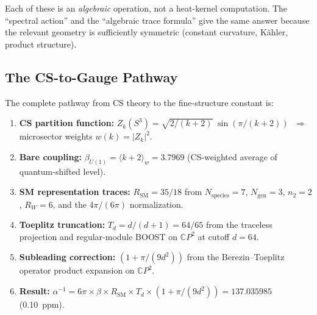 \documentclass[12pt,a4paper]{article}
\theoremstyle{definition}
\theoremstyle{remark}
\begin{document}
Each of these is an \emph{algebraic} operation, not a heat-kernel computation.
The ``spectral action'' and the ``algebraic trace formula'' give the same
answer because the relevant geometry is sufficiently symmetric
(constant curvature, K\"ahler, product structure).

\subsection{The CS-to-Gauge Pathway}

The complete pathway from CS theory to the fine-structure constant is:

\begin{tcolorbox}[colback=blue!5!white, colframe=blue!75!black,
  title={CS $\to$ Gauge Coupling Pathway (No Heat Kernel)}]
\begin{enumerate}
\item \textbf{CS partition function:}
  $Z_k(S^3) = \sqrt{2/(k+2)}\;\sin(\pi/(k+2))$
  $\;\Longrightarrow\;$ microsector weights $w(k) = |Z_k|^2$.

\item \textbf{Bare coupling:}
  $\beta_{U(1)} = \langle k+2 \rangle_w = 3.7969$
  (CS-weighted average of quantum-shifted level).

\item \textbf{SM representation traces:}
  $R_{\mathrm{SM}} = 35/18$ from $N_{\mathrm{species}} = 7$,
  $N_{\mathrm{gen}} = 3$, $n_2 = 2$, $R_W = 6$,
  and the $4\pi/(6\pi)$ normalization.

\item \textbf{Toeplitz truncation:}
  $T_d = d/(d+1) = 64/65$ from the traceless projection and
  regular-module BOOST on $\mathbb{C}P^2$ at cutoff $d = 64$.

\item \textbf{Subleading correction:}
  $(1 + \pi/(9d^2))$ from the Berezin--Toeplitz operator product
  expansion on $\mathbb{C}P^2$.

\item \textbf{Result:}
  $\alpha^{-1} = 6\pi \times \beta \times R_{\mathrm{SM}} \times T_d
  \times (1 + \pi/(9d^2)) = 137.035985$ \quad(0.10~ppm).
\end{enumerate}
\end{tcolorbox}

\end{document}
